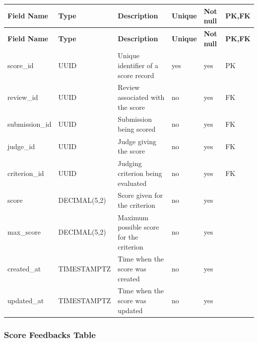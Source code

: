 \vspace{0.5em}
\renewcommand{\arraystretch}{1.15}
\setlength{\tabcolsep}{4pt}
\small
\begin{longtable}{|>{\raggedright\arraybackslash}p{}|>{\raggedright\arraybackslash}p{}|>{\raggedright\arraybackslash}p{}|>{\centering\arraybackslash}p{}|>{\centering\arraybackslash}p{}|>{\centering\arraybackslash}p{}|}
\hline
\textbf{Field Name} & \textbf{Type} & \textbf{Description} & \textbf{Unique} & \textbf{Not null} & \textbf{PK,FK} \\
\hline
\endfirsthead
\textbf{Field Name} & \textbf{Type} & \textbf{Description} & \textbf{Unique} & \textbf{Not null} & \textbf{PK,FK} \\
\hline
\endhead
score\_id & UUID & Unique identifier of a score record & yes & yes & PK \\
\hline
review\_id & UUID & Review associated with the score & no & yes & FK \\
\hline
submission\_id & UUID & Submission being scored & no & yes & FK \\
\hline
judge\_id & UUID & Judge giving the score & no & yes & FK \\
\hline
criterion\_id & UUID & Judging criterion being evaluated & no & yes & FK \\
\hline
score & DECIMAL(5,2) & Score given for the criterion & no & yes & \\
\hline
max\_score & DECIMAL(5,2) & Maximum possible score for the criterion & no & yes & \\
\hline
created\_at & TIMESTAMPTZ & Time when the score was created & no & yes & \\
\hline
updated\_at & TIMESTAMPTZ & Time when the score was updated & no & yes & \\
\hline
\end{longtable}

\vspace{1em}
\subsubsection{Score Feedbacks Table}
\label{subsubsec:score-feedbacks-table}

